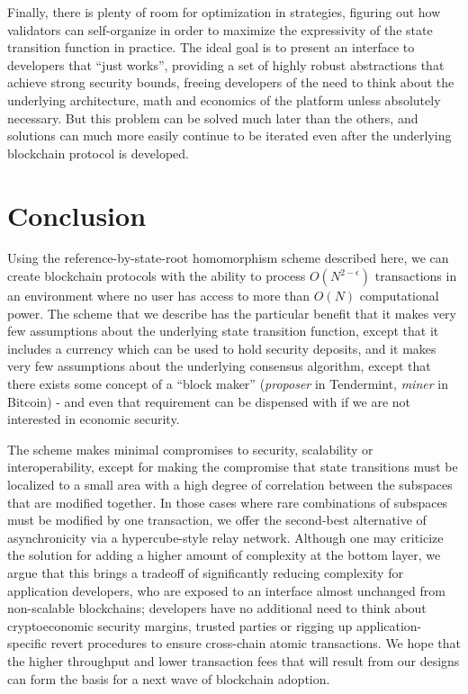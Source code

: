 \documentclass[11pt,a4paper]{article}
\theoremstyle{plain}
\theoremstyle{definition}
\theoremstyle{remark}
\begin{document}
Finally, there is plenty of room for optimization in strategies, figuring out how validators can self-organize in order to maximize the expressivity of the state transition function in practice. The ideal goal is to present an interface to developers that ``just works'', providing a set of highly robust abstractions that achieve strong security bounds, freeing developers of the need to think about the underlying architecture, math and economics of the platform unless absolutely necessary. But this problem can be solved much later than the others, and solutions can much more easily continue to be iterated even after the underlying blockchain protocol is developed.

\section{Conclusion}

Using the reference-by-state-root homomorphism scheme described here, we can create blockchain protocols with the ability to process $O(N^{2-\epsilon})$ transactions in an environment where no user has access to more than $O(N)$ computational power. The scheme that we describe has the particular benefit that it makes very few assumptions about the underlying state transition function, except that it includes a currency which can be used to hold security deposits, and it makes very few assumptions about the underlying consensus algorithm, except that there exists some concept of a ``block maker'' (\emph{proposer} in Tendermint, \emph{miner} in Bitcoin) - and even that requirement can be dispensed with if we are not interested in economic security.

The scheme makes minimal compromises to security, scalability or interoperability, except for making the compromise that state transitions must be localized to a small area with a high degree of correlation between the subspaces that are modified together. In those cases where rare combinations of subspaces must be modified by one transaction, we offer the second-best alternative of asynchronicity via a hypercube-style relay network. Although one may criticize the solution for adding a higher amount of complexity at the bottom layer, we argue that this brings a tradeoff of significantly reducing complexity for application developers, who are exposed to an interface almost unchanged from non-scalable blockchains; developers have no additional need to think about cryptoeconomic security margins, trusted parties or rigging up application-specific revert procedures to ensure cross-chain atomic transactions. We hope that the higher throughput and lower transaction fees that will result from our designs can form the basis for a next wave of blockchain adoption.
\end{document}
